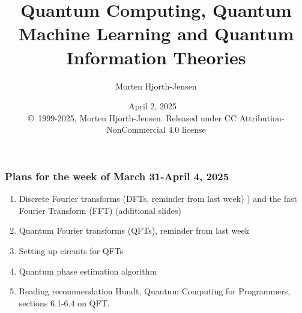 \documentclass{beamer}
\begin{document}

\newcommand{\exercisesection}[1]{\subsection*{#1}}







\title{Quantum Computing, Quantum Machine Learning and Quantum Information Theories}


\author{Morten Hjorth-Jensen}

\date{April 2, 2025
\ \\ 
{\tiny \copyright\ 1999-2025, Morten Hjorth-Jensen. Released under CC Attribution-NonCommercial 4.0 license}
}

\begin{frame}
\titlepage
\end{frame}

\begin{frame}
\frametitle{Plans for the week of March 31-April 4, 2025}

\begin{block}{}
\begin{enumerate}
\item Discrete Fourier transforms (DFTs, reminder from last week) ) and the fast Fourier Transform (FFT) (additional slides)

\item Quantum Fourier transforms (QFTs), reminder from last week

\item Setting up circuits for QFTs

\item Quantum phase estimation algorithm

\item Reading recommendation Hundt, Quantum Computing for Programmers, sections 6.1-6.4 on QFT.
\end{enumerate}

\noindent
\end{block}
\end{frame}
\end{document}
